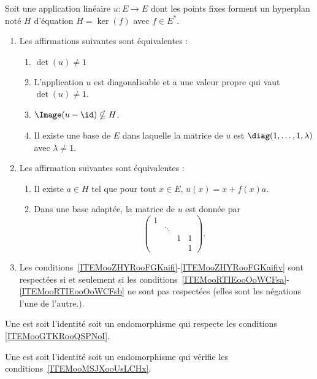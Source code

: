 \begin{theoremDef}     \label{ThoooAZKDooNDcznv}
	Soit une application linéaire \( u\colon E\to E\) dont les points fixes forment un hyperplan noté \( H\) d'équation \( H=\ker(f)\) avec \( f\in E^*\).
	\begin{enumerate}
		\item     \label{ITEMooGTKRooQSPNoI}
		      Les affirmations suivantes sont équivalentes :
		      \begin{enumerate}
			      \item  \label{ITEMooZHYRooFGKaifi}
			            \( \det(u)\neq 1\)
			      \item       \label{ooXKLWooTfUMzV}
			            L'application \( u\) est diagonalisable et a une valeur propre qui vaut \( \det(u)\neq 1\).
			      \item       \label{ooMZPTooCLylbh}
			            \( \Image(u-\id)\nsubseteq H\).
			      \item   \label{ITEMooZHYRooFGKaifiv}
			            Il existe une base de \( E\) dans laquelle la matrice de \( u\) est \( \diag(1,\ldots, 1,\lambda)\) avec \( \lambda\neq 1\).
		      \end{enumerate}
		\item       \label{ITEMooMSJXooUsLCHx}
		      Les affirmation suivantes sont équivalentes :
		      \let\oldthenumii\theenumi
		      \renewcommand{\theenumii}{\roman{enumii}}
		      \begin{enumerate}
			      \item       \label{ITEMooRTIEooOoWCFsa}
			            Il existe \( a\in H\) tel que pour tout \( x\in E\), \( u(x)=x+f(x)a\).
			      \item       \label{ITEMooRTIEooOoWCFsb}
			            Dans une base adaptée, la matrice de \( u\) est donnée par
			            \begin{equation}        \label{EQooFXBDooTgZwMv}
				            \begin{pmatrix}
					            1 &        &   &   \\
					              & \ddots &   &   \\
					              &        & 1 & 1 \\
					              &        &   & 1
				            \end{pmatrix}.
			            \end{equation}
		      \end{enumerate}
		      \let\theenumii\oldtheenumii
		\item
		      Les conditions~\ref{ITEMooZHYRooFGKaifi}-\ref{ITEMooZHYRooFGKaifiv} sont respectées si et seulement si les conditions~\ref{ITEMooRTIEooOoWCFsa}-\ref{ITEMooRTIEooOoWCFsb} ne sont pas respectées (elles sont les négations l'une de l'autre.).
	\end{enumerate}
	Une  est soit l'identité soit un endomorphisme qui respecte les conditions \ref{ITEMooGTKRooQSPNoI}.

	Une  est soit l'identité soit un endomorphisme qui vérifie les conditions~\ref{ITEMooMSJXooUsLCHx}.

\end{theoremDef}



